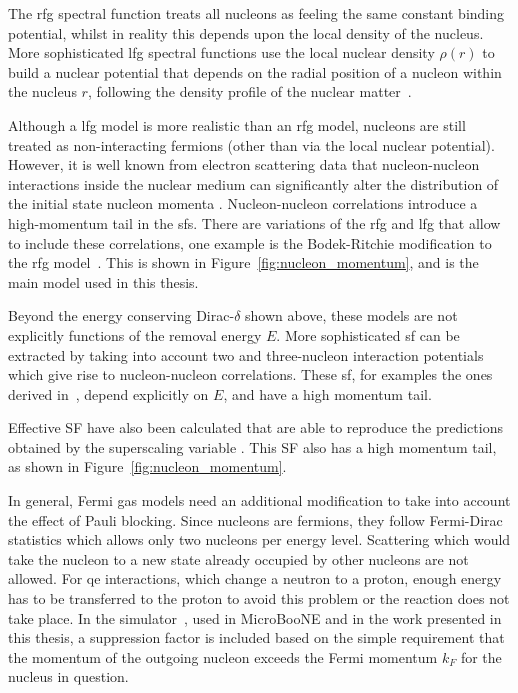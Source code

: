 The \acrshort{rfg} spectral function treats all nucleons as feeling the same constant binding potential, whilst in reality this depends upon the local density of the nucleus. More sophisticated \acrfull{lfg} spectral functions use the local nuclear density $\rho(r)$ to build a nuclear potential that depends on the radial position of a nucleon within the nucleus $r$, following the density profile of the nuclear matter~\cite{nieves_lfg}.

Although a \acrshort{lfg}  model is more realistic than an \acrshort{rfg}  model, nucleons are still treated as non-interacting fermions (other than via the local nuclear potential). However, it is well known from electron scattering data that nucleon-nucleon interactions inside the nuclear medium can significantly alter the distribution of the initial state nucleon momenta \cite{huberts, rohe}. Nucleon-nucleon correlations introduce a high-momentum tail in the \acrshort{sf}s. There are variations of the \acrshort{rfg} and \acrshort{lfg} that allow to include these correlations, one example is the Bodek-Ritchie modification to the \acrshort{rfg} model~\cite{bodek_ritchie_fermigas}. This is shown in Figure~\ref{fig:nucleon_momentum}, and is the main model used in this thesis.

Beyond the energy conserving Dirac-$\delta$ shown above, these models are not explicitly functions of the removal energy $E$. More sophisticated \acrshort{sf} can be extracted by taking into account two and three-nucleon interaction potentials which give rise to nucleon-nucleon correlations. These \acrshort{sf}, for examples the ones derived in~\cite{ia_approximation}, depend explicitly on $E$, and have a high momentum tail.

Effective SF have also been calculated \cite{esf} that are able to reproduce the predictions obtained by the superscaling variable \cite{superscaling}. This SF also has a high momentum tail, as shown in Figure~\ref{fig:nucleon_momentum}.

In general, Fermi gas models need an additional modification to take into account the effect of Pauli blocking. Since nucleons are fermions, they follow Fermi-Dirac statistics which allows only two nucleons per energy level. Scattering which would take the nucleon to a new state already occupied by other nucleons are not allowed. For \acrshort{qe} interactions, which change a neutron to a proton, enough energy has to be transferred to the proton to avoid this problem or the reaction does not take place. In the \g simulator~\cite{GENIE}, used in MicroBooNE and in the work presented in this thesis, a suppression factor is included based on the simple requirement that the momentum of the outgoing nucleon exceeds the Fermi momentum $k_F$ for the nucleus in question.

